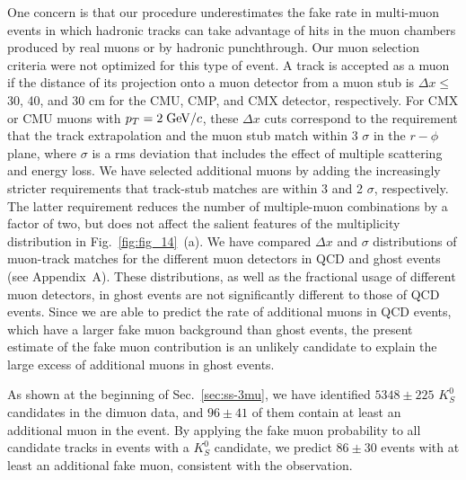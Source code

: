 \documentclass[aps,prd,preprint,floatfix,nofootinbib,superscriptaddress,showpacs,amssymb]{revtex4}
\begin{document}
 One concern is that our procedure underestimates the fake rate in 
 multi-muon events in which hadronic tracks can take advantage of hits
 in the muon chambers produced by real muons or by hadronic punchthrough.
 Our muon selection criteria were not optimized for this type
 of event. A track is accepted as a muon if the distance of its 
 projection onto a muon detector from a muon stub is $\Delta x\leq$ 30, 40,
 and 30 cm for the CMU, CMP, and CMX detector, respectively. For CMX 
 or CMU muons with $p_T=2\; {\rm GeV/}c$, these $\Delta x $ cuts correspond to
 the requirement that the track extrapolation and the muon stub match
 within 3 $\sigma$ in the $r-\phi$ plane, where $\sigma$ is a rms 
 deviation that includes the effect of multiple scattering and energy loss.
 We have selected additional muons by adding the increasingly stricter
 requirements that track-stub matches are within 3 and 2 $\sigma$, 
 respectively. The latter requirement reduces the number of multiple-muon
 combinations by a factor of two, but does not affect the salient features
 of the multiplicity distribution in  Fig.~\ref{fig:fig_14}~(a). We have
 compared $\Delta x $ and  $\sigma$ distributions of muon-track matches
 for the different muon detectors in QCD and ghost events (see Appendix~A).
 These distributions, as well as the fractional usage of different muon
 detectors, in ghost events are not significantly different to those
 of QCD events. Since we are able to predict the rate of additional
 muons in QCD events, which have a larger fake muon background than
 ghost events, the present estimate of the fake muon contribution is an
 unlikely candidate to explain the large excess of additional muons in
 ghost events.

 As shown at the beginning of Sec.~\ref{sec:ss-3mu}, we have identified 
 $5348 \pm 225$  $K^0_S$ candidates in the dimuon data,  and $96 \pm 41$
 of them contain at least an additional muon in the event. By applying the 
 fake muon probability to all candidate tracks in events with a $K^0_S$
 candidate, we predict $86 \pm 30$  events with at least an  additional
 fake muon, consistent with the observation. 
\end{document}
